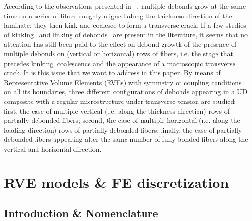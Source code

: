 \documentclass[review]{elsarticle}
\begin{document}
According to the observations presented in ~\cite{Bailey1981}, multiple debonds grow at the same time on a series of fibers roughly aligned along the thickness direction of the laminate; they then kink and coalesce to form a transverse crack. If a few studies of kinking~\cite{Paris2007,Zhuang2018a} and linking of debonds~\cite{Varna2017} are present in the literature, it seems that no attention has still been paid to the effect on debond growth of the presence of multiple debonds on (vertical or horizontal) rows of fibers, i.e. the stage that precedes kinking, coalescence and the appearance of a macroscopic transverse crack. It is this issue that we want to address in this paper. By means of Representative Volume Elements (RVEs) with symmetry or coupling conditions on all its boundaries, three different configurations of debonds appearing in a UD composite with a regular microstructure under transverse tension are studied: first, the case of multiple vertical (i.e. along the thickness direction) rows of partially debonded fibers; second, the case of multiple horizontal (i.e. along the loading direction) rows of partially debonded fibers; finally, the case of partially debonded fibers appearing after the same number of fully bonded fibers along the vertical and horizontal direction. 


\section{RVE models \& FE discretization}

\subsection{Introduction \& Nomenclature}\label{subsec:names}
\end{document}
